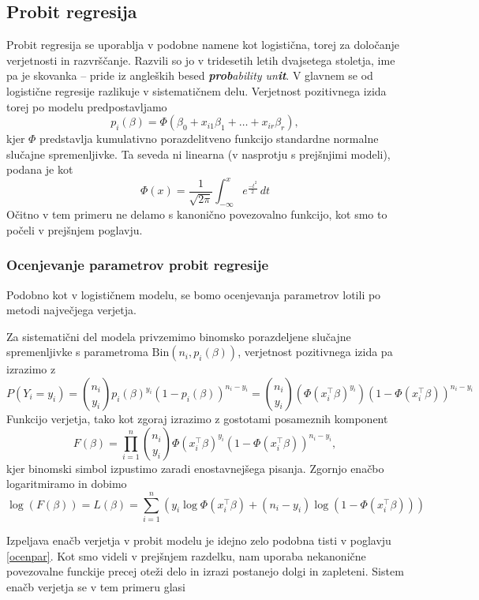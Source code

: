 \documentclass[12pt,a4paper]{amsart}
\theoremstyle{definition} %
\theoremstyle{plain} %
\begin{document}
\subsection{Probit regresija} %
Probit regresija se uporablja v podobne namene kot logistična, torej za določanje verjetnosti in razvrščanje. Razvili so jo v tridesetih letih
dvajsetega stoletja, ime pa je skovanka -- pride iz angleških besed \textit{\textbf{prob}ability un\textbf{it}}. V glavnem se od logistične regresije
razlikuje v sistematičnem delu. Verjetnost pozitivnega izida torej po modelu predpostavljamo
\begin{equation}
    p_{i}(\beta) = \Phi (\beta_{0} + x_{i1}\beta_{1} + \ldots + x_{ir}\beta_{r}),
\end{equation}
kjer $\Phi$ predstavlja kumulativno porazdelitveno funkcijo standardne normalne slučajne spremenljivke. Ta seveda ni linearna (v nasprotju s prejšnjimi modeli),
podana je kot 
\[
    \Phi(x) = \frac{1}{\sqrt{2\pi}}\int_{-\infty}^{x}e^{\frac{-t^2}{2}}\,dt
\]
Očitno v tem primeru ne delamo s kanonično povezovalno funkcijo, kot smo to počeli v prejšnjem poglavju.
\subsubsection{Ocenjevanje parametrov probit regresije}
Podobno kot v logističnem modelu, se bomo ocenjevanja parametrov lotili po metodi največjega verjetja. 

Za sistematični del modela privzemimo binomsko porazdeljene slučajne spremenljivke s parametroma $\mathrm{Bin}(n_{i},p_{i}(\beta))$,
verjetnost pozitivnega izida pa izrazimo z
\[
    P(Y_{i} = y_{i}) = \binom{n_{i}}{y_{i}}p_{i}(\beta)^{y_{i}}(1 - p_{i}(\beta))^{n_{i} - y_{i}} = \binom{n_{i}}{y_{i}} (\Phi(x_{i}^\top \beta)^{y_{i}})(1 - \Phi(x_{i}^\top \beta))^{n_{i} - y_{i}} 
\]
Funkcijo verjetja, tako kot zgoraj izrazimo z gostotami posameznih komponent
\[
    F(\beta) = \prod_{i=1}^{n} \binom{n_{i}}{y_{i}} \Phi(x_{i}^\top\beta)^{y_{i}}(1 - \Phi(x_{i}^\top\beta))^{n_{i} - y_{i}},
\]
kjer binomski simbol izpustimo zaradi enostavnejšega pisanja. Zgornjo enačbo logaritmiramo in dobimo
\begin{equation}
    \log(F(\beta)) = L(\beta) = \sum_{i = 1}^{n}\left(y_{i}\log\Phi(x_{i}^\top\beta) + (n_{i} - y_{i})\log(1 - \Phi(x_{i}^\top\beta)) \right)
\end{equation}

Izpeljava enačb verjetja v probit modelu je idejno zelo podobna tisti v poglavju \ref{ocenpar}. Kot smo videli v prejšnjem razdelku, nam uporaba nekanonične povezovalne
funckije precej oteži delo in izrazi postanejo dolgi in zapleteni. Sistem enačb verjetja se v tem primeru glasi
\end{document}
